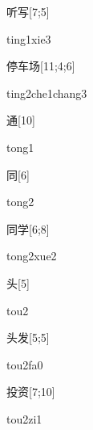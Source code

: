 \begin{verbete}{听写}[7;5]
\begin{pronuncia}{ting1xie3}
\end{pronuncia}
\end{verbete}

\begin{verbete}{停车场}[11;4;6]
\begin{pronuncia}[\\]{ting2che1chang3}
\end{pronuncia}
\end{verbete}

\begin{verbete}[tong1]{通}[10]
\begin{pronuncia}{tong1}
\end{pronuncia}
\end{verbete}

\begin{verbete}[tong2]{同}[6]
\begin{pronuncia}{tong2}
\end{pronuncia}
\end{verbete}

\begin{verbete}{同学}[6;8]
\begin{pronuncia}{tong2xue2}
\end{pronuncia}
\end{verbete}

\begin{verbete}[tou2]{头}[5]
\begin{pronuncia}{tou2}
\end{pronuncia}
\end{verbete}

\begin{verbete}[tou2fa0]{头发}[5;5]
\begin{pronuncia}{tou2fa0}
\end{pronuncia}
\end{verbete}

\begin{verbete}[tou2zi1]{投资}[7;10]
\begin{pronuncia}{tou2zi1}
\end{pronuncia}
\end{verbete}

